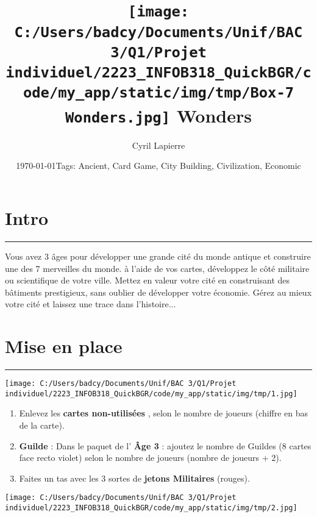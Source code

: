 \documentclass{scrartcl}%
\title{\texttt{[image: C:/Users/badcy/Documents/Unif/BAC 3/Q1/Projet individuel/2223\_INFOB318\_QuickBGR/code/my\_app/static/img/tmp/Box-7 Wonders.jpg]}\break 7 Wonders }%
\author{Cyril Lapierre}%
\date{\today \break Tags: Ancient, Card Game, City Building, Civilization, Economic}%
\begin{document}
%
\normalsize%
\maketitle\thispagestyle{header}%
\pagestyle{header}%
\sectionfont{\color{blue}}%
\subsectionfont{\color{blue}}%
\subsubsectionfont{\color{blue}}%
\section{ Intro
}%
\label{sec:Intro}%
\textcolor{blue}{\rule{18cm}{0.07cm}}\break%
Vous avez 3 âges pour développer une grande cité du monde antique et construire une des 7 merveilles du
%
monde. à l’aide de vos cartes, développez le côté militaire ou scientifique de votre ville. Mettez en valeur
%
votre cité en construisant des bâtiments prestigieux, sans oublier de développer votre économie.
%
Gérez au mieux votre cité et laissez une trace dans l'histoire...


%
\sectionfont{\color{mygreen}}%
\subsectionfont{\color{mygreen}}%
\subsubsectionfont{\color{mygreen}}%
\section{ Mise en place
}%
\label{sec:Miseenplace}%
\textcolor{mygreen}{\rule{18cm}{0.07cm}}\break%
%
\begin{center}\texttt{[image: C:/Users/badcy/Documents/Unif/BAC 3/Q1/Projet individuel/2223\_INFOB318\_QuickBGR/code/my\_app/static/img/tmp/1.jpg]}\end{center}%

%

%
\begin{enumerate}%
\item%
%
 Enlevez les %
\textcolor{mygreen}{%
\textbf{cartes non{-}utilisées}%
}%
, selon le nombre de joueurs (chiffre en bas de la carte).
%
\item%
%
\textcolor{mygreen}{%
\textbf{Guilde}%
}%
\textit{ }%
 : Dans le paquet de l'%
\textcolor{mygreen}{%
\textbf{Âge 3}%
}%
\textit{ }%
 : ajoutez le nombre de Guildes (8 cartes face recto violet) selon le nombre de joueurs (nombre de joueurs + 2).
%
\item%
%
 Faites un tas avec les 3 sortes de %
\textcolor{mygreen}{%
\textbf{jetons Militaires}%
}%
\textit{ }%
 (rouges).
%
\end{enumerate}%
%
\begin{center}\texttt{[image: C:/Users/badcy/Documents/Unif/BAC 3/Q1/Projet individuel/2223\_INFOB318\_QuickBGR/code/my\_app/static/img/tmp/2.jpg]}\end{center}%
\end{document}
